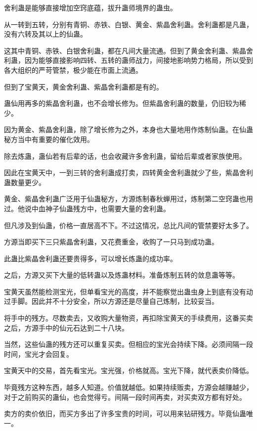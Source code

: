 
\begin{this_body}

舍利蛊是能够直接增加空窍底蕴，拔升蛊师境界的蛊虫。

从一转到五转，分别有青铜、赤铁、白银、黄金、紫晶舍利蛊。舍利蛊都是凡蛊，没有六转及其以上的仙蛊。

这其中青铜、赤铁、白银舍利蛊，都在凡间大量流通。但到了黄金舍利蛊、紫晶舍利蛊，因为能够直接影响四转、五转的蛊师战力，间接地影响势力格局，所以受到各大组织的严苛管禁，极少能在市面上流通。

但到了宝黄天，黄金舍利蛊、紫晶舍利蛊都是有的。

蛊仙用再多的紫晶舍利蛊，也不会增长修为。但紫晶舍利蛊的数量，仍旧较为稀少。

因为黄金、紫晶舍利蛊，除了增长修为之外，本身也大量地用作炼制仙蛊。在仙蛊秘方当中有重要的催化效用。

除去炼蛊，蛊仙若有后辈的话，也会收藏许多舍利蛊，留给后辈或者家族使用。

因此在宝黄天中，一到三转的舍利蛊成打卖，四转黄金舍利蛊就少了些，紫晶舍利蛊数量更少。

黄金、紫晶舍利蛊广泛用于仙蛊秘方，方源炼制春秋蝉用过，炼制第二空窍蛊也用过。他说中血神子仙蛊残方中，也需要大量的舍利蛊。

但凡涉及到仙蛊，价格一直居高不下。不过这情况，总比凡间的管禁要好太多了。

方源当即买下三只紫晶舍利蛊，又花费重金，收购了一只马到成功蛊。

此蛊比紫晶舍利蛊还要贵得多，可以增长炼蛊的成功率。

之后，方源又买下大量的低转蛊以及炼蛊材料。准备炼制五转的敛息蛊等等。

宝黄天虽然能检测宝光，但单看宝光的高度，并不能察觉出蛊虫身上到底有没有动过手脚。因此并不十分安全，所以方源还是尽量自己炼制，比较妥当。

将手中的残方。尽数卖去，又收购大量物资，再扣除宝黄天的手续费用，这番买卖之后，方源手中的仙元石达到二十八块。

当然，这些仙蛊的残方还可以重复买卖。但相应的宝光会持续下降。必须间隔一段时间，宝光才会回复。

宝黄天中的交易，首先看宝光。宝光强，价格就高。宝光下降，就代表卖价降低。

毕竟残方这种东西，越多人知道。价值就越低。如果持续贩卖，方源会越赚越少，对于之前购买的蛊仙，也会觉得亏。间隔一段时间再卖，对买卖双方都有好处。

卖方的卖价依旧，而买方多出了许多宝贵的时间，可以用来钻研残方。毕竟仙蛊唯一。


\end{this_body}
